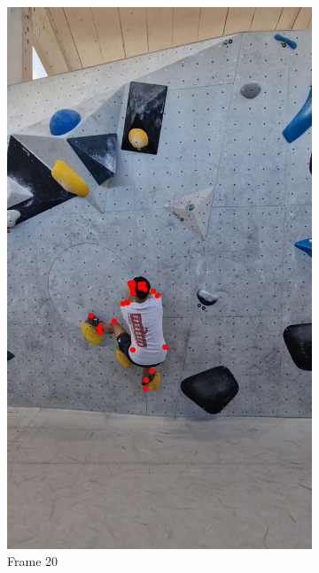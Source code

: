 \documentclass[./main.tex]{subfiles}
\begin{document}
\begin{figure}[htbp]
\begin{subfigure}{0.3\textwidth}
        \includegraphics[width=\textwidth]{entities/CA_20.png}
        \caption{Frame 20}
    \end{subfigure}
    \begin{subfigure}{0.3\textwidth}
        \centering

\end{subfigure}
\end{figure}
\end{document}
